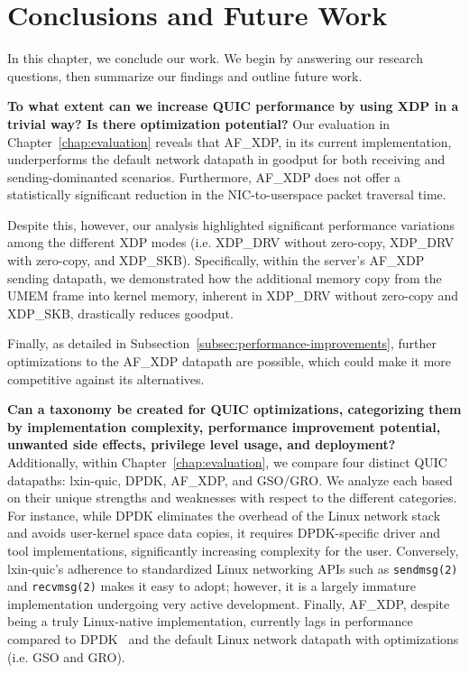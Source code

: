\chapter{Conclusions and Future Work}
\label{chap:conclusion}
In this chapter, we conclude our work. We begin by answering our research questions, then summarize our findings and outline future work.

\textbf{To what extent can we increase QUIC performance by using XDP in a trivial way? Is there optimization potential?} Our evaluation in Chapter~\ref{chap:evaluation} reveals that AF\_XDP, in its current implementation, underperforms the default network datapath in goodput for both receiving and sending-dominanted scenarios. Furthermore, AF\_XDP does not offer a statistically significant reduction in the NIC-to-userspace packet traversal time.

Despite this, however, our analysis highlighted significant performance variations among the different XDP modes (i.e. XDP\_DRV without zero-copy, XDP\_DRV with zero-copy, and XDP\_SKB). Specifically, within the server's AF\_XDP sending datapath, we demonstrated how the additional memory copy from the UMEM frame into kernel memory, inherent in XDP\_DRV without zero-copy and XDP\_SKB, drastically reduces goodput.

Finally, as detailed in Subsection~\ref{subsec:performance-improvements}, further optimizations to the AF\_XDP datapath are possible, which could make it more competitive against its alternatives.

\textbf{Can a taxonomy be created for QUIC optimizations, categorizing them by implementation complexity, performance improvement potential, unwanted side effects, privilege level usage, and deployment?} Additionally, within Chapter~\ref{chap:evaluation}, we compare four distinct QUIC datapaths: lxin-quic, \ac{DPDK}, AF\_XDP, and \ac{GSO}/\ac{GRO}. We analyze each based on their unique strengths and weaknesses with respect to the different categories. For instance, while \ac{DPDK} eliminates the overhead of the Linux network stack and avoids user-kernel space data copies, it requires DPDK-specific driver and tool implementations, significantly increasing complexity for the user. Conversely, lxin-quic's adherence to standardized Linux networking APIs such as \texttt{sendmsg(2)} and \texttt{recvmsg(2)} makes it easy to adopt; however, it is a largely immature implementation undergoing very active development. Finally, AF\_XDP, despite being a truly Linux-native implementation, currently lags in performance compared to DPDK~\cite{2018AFXDPPerf} and the default Linux network datapath with optimizations (i.e. \ac{GSO} and \ac{GRO}).

